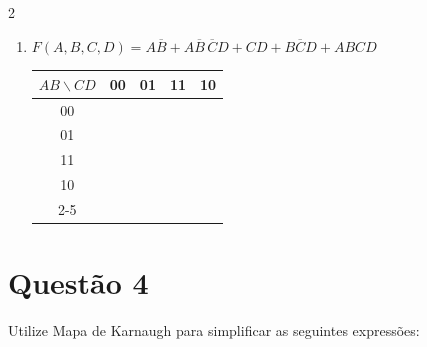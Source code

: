 \documentclass[12pt,a4paper]{article}
\begin{document}
\begin{multicols}{2}
\begin{enumerate}[label=\alph*)]
  \item \begin{minipage}[t]{\linewidth}
    {\footnotesize $F(A,B,C,D) = A\overline{B} + A\overline{B}\,\overline{C}D + CD + B\overline{C}D + ABCD$}

    \begin{center}
      \begin{tabular}{c|c|c|c|c|}
        $AB \backslash CD$ & 00 & 01 & 11 & \multicolumn{1}{c}{10} \\
        \hline
        00 & \phantom{0} & \phantom{0} & \phantom{0} & \phantom{0} \\
        \hline
        01 & \phantom{0} & \phantom{0} & \phantom{0} & \phantom{0} \\
        \hline
        11 & \phantom{0} & \phantom{0} & \phantom{0} & \phantom{0} \\
        \hline
        10 & \phantom{0} & \phantom{0} & \phantom{0} & \phantom{0} \\
        \cline{2-5}
      \end{tabular}
    \end{center}
  \end{minipage}

\end{enumerate}
\end{multicols}

\section{Questão 4}

Utilize Mapa de Karnaugh para simplificar as seguintes expressões:
\end{document}
